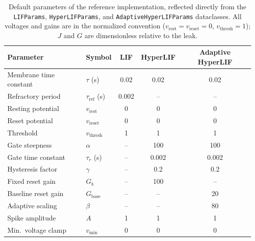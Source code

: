 \begin{table}[t]
\centering
\caption{Default parameters of the reference implementation, reflected directly from the \texttt{LIFParams}, \texttt{HyperLIFParams}, and \texttt{AdaptiveHyperLIFParams} dataclasses. All voltages and gains are in the normalized convention ($v_{\mathrm{rest}}=v_{\mathrm{reset}}=0$, $v_{\mathrm{thresh}}=1$); $J$ and $G$ are dimensionless relative to the leak.}
\label{tab:params}
\begin{tabular}{llccc}
\toprule
Parameter & Symbol & LIF & HyperLIF & Adaptive HyperLIF \\
\midrule
Membrane time constant & $\tau$ (s) & 0.02 & 0.02 & 0.02 \\
Refractory period & $\tau_{\mathrm{ref}}$ (s) & 0.002 & -- & -- \\
Resting potential & $v_{\mathrm{rest}}$ & 0 & 0 & 0 \\
Reset potential & $v_{\mathrm{reset}}$ & 0 & 0 & 0 \\
Threshold & $v_{\mathrm{thresh}}$ & 1 & 1 & 1 \\
Gate steepness & $\alpha$ & -- & 100 & 100 \\
Gate time constant & $\tau_r$ (s) & -- & 0.002 & 0.002 \\
Hysteresis factor & $\gamma$ & -- & 0.2 & 0.2 \\
Fixed reset gain & $G_b$ & -- & 100 & -- \\
Baseline reset gain & $G_{\mathrm{base}}$ & -- & -- & 20 \\
Adaptive scaling & $\beta$ & -- & -- & 80 \\
Spike amplitude & $A$ & 1 & 1 & 1 \\
Min.\ voltage clamp & $v_{\min}$ & 0 & 0 & 0 \\
\bottomrule
\end{tabular}
\end{table}
